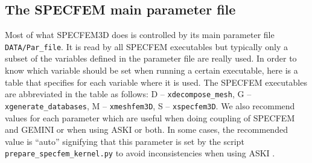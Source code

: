 \subsection{The SPECFEM main parameter file}
\label{sec:parfile}
%
Most of what SPECFEM3D does is controlled by its main parameter file \verb+DATA/Par_file+. It is read by all SPECFEM executables but typically only a subset of the variables defined in the parameter file are really used. In order to know which variable should be set when running a certain executable, here is a table that specifies for each variable where it is used. The SPECFEM executables are abbreviated in the table as follows: D -- \verb+xdecompose_mesh+, G -- \verb+xgenerate_databases+, M -- \verb+xmeshfem3D+, S -- \verb+xspecfem3D+. We also recommend values for each parameter which are useful when doing coupling of SPECFEM and GEMINI or when using ASKI or both. In some cases, the recommended value is ``auto'' signifying that this parameter is set by the script \verb+prepare_specfem_kernel.py+ to avoid inconsistencies when using ASKI .
%
